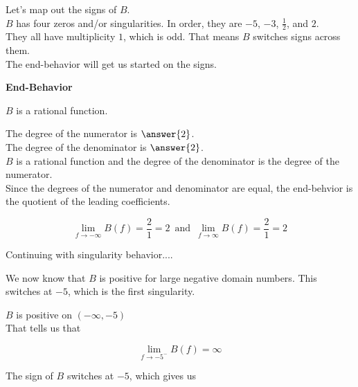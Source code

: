 \documentclass{ximera}
\begin{document}
\begin{example}
Let's map out the signs of $B$. \\



$B$ has four zeros and/or singularities. In order, they are $-5$, $-3$, $\frac{1}{2}$, and $2$.\\

They all have multiplicity $1$, which is odd.  That means $B$ switches signs across them. \\


The end-behavior will get us started on the signs.
















\textbf{End-Behavior}


$B$ is a rational function.

The degree of the numerator is $\answer{2}$. \\


The degree of the denominator is $\answer{2}$. \\


$B$ is a rational function and the degree of the denominator is  the degree of the numerator. \\


Since the degrees of the numerator and denominator are equal, the end-behvior is the quotient of the leading coefficients.


\[ \lim_{f \to -\infty} B(f) = \frac{2}{1} = 2   \, \text{ and }  \,  \lim_{f \to \infty} B(f) = \frac{2}{1} = 2    \]





\begin{explanation} Continuing with singularity behavior....




We now know that $B$ is positive for large negative domain numbers.  This switches at $-5$, which is the first singularity.

$B$ is positive on $(-\infty, -5)$ \\

That tells us that 

\[
\lim\limits_{f \to -5^-} B(f) = \infty 
\]

The sign of $B$ switches at $-5$, which gives us 



\end{explanation}
\end{example}
\end{document}
